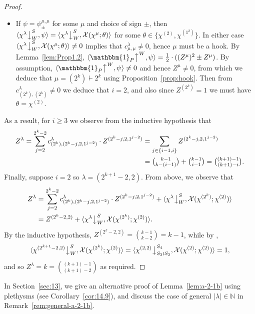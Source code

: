 \documentclass[ALCO, Unicode]{cedram}
\newcommand{\triv}{\mathbbm{1}}
\newcommand{\down}{\big\downarrow}
\newcommand{\up}{\big\uparrow}
\newcommand{\cX}{\mathcal{X}}
\newcommand{\N}{\mathbb{N}}
\begin{document}
\begin{proof}
\begin{itemize}
		\item If $\psi=\psi^{\mu,\mu}_{\pm}$ for some $\mu$ and choice of sign $\pm$, then $\langle \chi^\lambda\down^S_W,\psi\rangle = \langle \chi^\lambda\down^S_W, \cX(\chi^\mu;\theta)\rangle$ for some $\theta\in\{\chi^{(2)},\chi^{(1^2)}\}$. In either case $\langle \chi^\lambda\down^S_W,\cX(\chi^\mu;\theta)\rangle\ne 0$ implies that $c^\lambda_{\mu,\mu}\ne 0$, hence $\mu$ must be a hook. By Lemma~\ref{lem:Prop1.2}, $\langle \triv_P\up^W,\psi\rangle = \tfrac{1}{2}\cdot((Z^\mu)^2 \pm Z^\mu)$. By assumption, $\langle \triv_P\up^W,\psi\rangle \ne 0$ and hence $Z^\mu\ne 0$, from which we deduce that $\mu=(2^k)\vdash 2^k$ using Proposition~\ref{prop:hook}. Then from $c^\lambda_{(2^k),(2^k)}\ne 0$ we deduce that $i=2$, and also since $Z^{(2^k)}=1$ we must have $\theta=\chi^{(2)}$.
	\end{itemize}
	As a result, for $i\ge 3$ we observe from the inductive hypothesis that
	\begin{align*}
		Z^\lambda = \sum_{j=2}^{2^k-2} c^\lambda_{(2^k), (2^k-j,2,1^{j-2})}\cdot Z^{(2^k-j,2,1^{j-2})} &= \sum_{j\in\{i-1,i\}} Z^{(2^k-j,2,1^{j-2})}\\
		&= \tbinom{k-1}{k-(i-1)} + \tbinom{k-1}{i-1} = \tbinom{(k+1)-1}{(k+1)-i}.
	\end{align*}
	Finally, suppose $i=2$ so $\lambda=(2^{k+1}-2,2)$. From above, we observe that
	\begin{align*}
		Z^\lambda &= \sum_{j=2}^{2^k-2} c^\lambda_{(2^k), (2^k-j,2,1^{j-2})}\cdot Z^{(2^k-j,2,1^{j-2})} + \langle \chi^\lambda\down^S_W, \cX(\chi^{(2^k)};\chi^{(2)})\rangle\\
		&= Z^{(2^k-2,2)} + \langle \chi^\lambda\down^S_W, \cX(\chi^{(2^k)};\chi^{(2)})\rangle.
	\end{align*}
	By the inductive hypothesis, $Z^{(2^k-2,2)}=\binom{k-1}{k-2}=k-1$, while by \cite[Theorem 1.2]{dBPW},
	\[ \langle \chi^{(2^{k+1}-2,2)}\down^S_W, \cX(\chi^{(2^k)};\chi^{(2)}) \rangle = \langle \chi^{(2,2)}\down^{S_4}_{S_2\wr S_2}, \cX(\chi^{(2)};\chi^{(2)}) \rangle = 1, \]
	and so $Z^\lambda=k=\binom{(k+1)-1}{(k+1)-2}$ as required.
\end{proof}

\begin{remark}
	In Section~\ref{sec:13}, we give an alternative proof of Lemma~\ref{lem:a-2-1b} using plethysms (see Corollary~\ref{cor:14.9}), and discuss the case of general $|\lambda|\in\N$ in Remark~\ref{rem:general-a-2-1b}.%
\end{remark}
\end{document}
